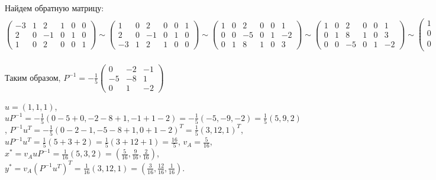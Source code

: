 \documentclass{article}
\begin{document}
Найдем обратную матрицу: $\begin{pmatrix}
    -3 & 1 & 2 & 1 & 0 & 0 \\
    2 & 0 & -1 & 0 & 1 & 0 \\
    1 & 0 & 2 & 0 & 0 & 1
\end{pmatrix} \sim \begin{pmatrix}
    1 & 0 & 2 & 0 & 0 & 1 \\
    2 & 0 & -1 & 0 & 1 & 0 \\
    -3 & 1 & 2 & 1 & 0 & 0
\end{pmatrix} \sim \begin{pmatrix}
    1 & 0 & 2 & 0 & 0 & 1 \\
    0 & 0 & -5 & 0 & 1 & -2 \\
    0 & 1 & 8 & 1 & 0 & 3
\end{pmatrix} \sim \begin{pmatrix}
    1 & 0 & 2 & 0 & 0 & 1 \\
    0 & 1 & 8 & 1 & 0 & 3 \\
    0 & 0 & -5 & 0 & 1 & -2
\end{pmatrix} \sim \begin{pmatrix}
    1 & 0 & 2 & 0 & 0 & 1 \\
    0 & 1 & 8 & 1 & 0 & 3 \\
    0 & 0 & 1 & 0 & \frac{-1}{5} & \frac{2}{5}
\end{pmatrix} \sim \begin{pmatrix}
    1 & 0 & 0 & 0 & \frac{2}{5} & \frac{1}{5} \\
    0 & 1 & 0 & 1 & \frac{8}{5} & -\frac{1}{5} \\
    0 & 0 & 1 & 0 & -\frac{1}{5} & \frac{2}{5}
\end{pmatrix}$

Таким образом, $P^{-1} = -\frac{1}{5} \begin{pmatrix}
    0 & -2 & -1 \\
    -5 & -8 & 1 \\
    0 & 1 & -2
\end{pmatrix}$

$u = (1, 1, 1)$, $u P^{-1} = -\frac{1}{5} (0 - 5 + 0, -2 - 8 + 1, -1 + 1 - 2) = -\frac{1}{5} (-5, -9, -2) = \frac{1}{5} (5, 9, 2)$, $P^{-1} u^{T} = -\frac{1}{5} (0 - 2 - 1, -5 - 8 + 1, 0 + 1 - 2)^{T} = \frac{1}{5} (3,12,1)^{T}$, $u P^{-1} u^{T} = \frac{1}{5} (5 + 3 + 2) = \frac{1}{5} (3 + 12 + 1) = \frac{16}{5}$, $v_{A} = \frac{5}{16}$, $x^{*} = v_{A} u P^{-1} = \frac{1}{16} (5, 3, 2) = (\frac{5}{16}, \frac{9}{16}, \frac{2}{16})$, $y^{*} = v_{A} (P^{-1} u^{T})^{T} = \frac{1}{16} (3, 12, 1) = (\frac{3}{16}, \frac{12}{16}, \frac{1}{16})$.
\end{document}
